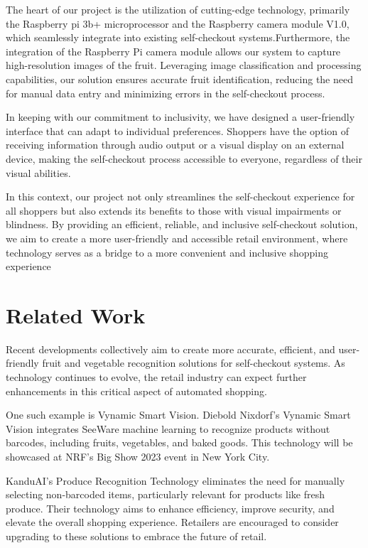 \documentclass[manuscript]{aastex631}
\begin{document}
The heart of our project is the utilization of cutting-edge technology, primarily the Raspberry pi 3b+ microprocessor and the Raspberry camera module V1.0, which seamlessly integrate into existing self-checkout systems.Furthermore, the integration of the Raspberry Pi camera module allows our system to capture high-resolution images of the fruit. Leveraging image classification and processing capabilities, our solution ensures accurate fruit identification, reducing the need for manual data entry and minimizing errors in the self-checkout process.

In keeping with our commitment to inclusivity, we have designed a user-friendly interface that can adapt to individual preferences. Shoppers have the option of receiving information through audio output or a visual display on an external device, making the self-checkout process accessible to everyone, regardless of their visual abilities.

In this context, our project not only streamlines the self-checkout experience for all shoppers but also extends its benefits to those with visual impairments or blindness. By providing an efficient, reliable, and inclusive self-checkout solution, we aim to create a more user-friendly and accessible retail environment, where technology serves as a bridge to a more convenient and inclusive shopping experience

\vspace{100pt} 

\section{Related Work} \label{sec:style}
Recent developments collectively aim to create more accurate, efficient, and user-friendly fruit and vegetable recognition solutions for self-checkout systems. As technology continues to evolve, the retail industry can expect further enhancements in this critical aspect of automated shopping. 

One such example is Vynamic Smart Vision. Diebold Nixdorf's Vynamic Smart Vision integrates SeeWare machine learning to recognize products without barcodes, including fruits, vegetables, and baked goods. This technology will be showcased at NRF's Big Show 2023 event in New York City.

KanduAI's Produce Recognition Technology eliminates the need for manually selecting non-barcoded items, particularly relevant for products like fresh produce. Their technology aims to enhance efficiency, improve security, and elevate the overall shopping experience. Retailers are encouraged to consider upgrading to these solutions to embrace the future of retail.
\end{document}
